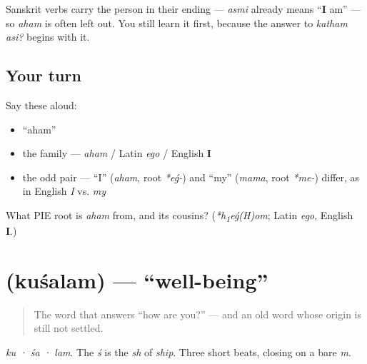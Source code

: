 \begin{grammarlens}[title={Grammar Lens: \textquotedblleft{}I\textquotedblright{} can be dropped}]
Sanskrit verbs carry the person in their ending — \emph{asmi} already means \textquotedblleft{}\textbf{I} am\textquotedblright{} — so \emph{aham} is often left out. You still learn it first, because the answer to \emph{katham asi?} begins with it.
\end{grammarlens}

\subsection*{Your turn}
Say these aloud:

\begin{itemize}
\raggedright
  \item \textquotedblleft{}aham\textquotedblright{}
  \item the family — \emph{aham} / Latin \emph{ego} / English \textbf{I}
  \item the odd pair — \textquotedblleft{}I\textquotedblright{} (\emph{aham}, root \emph{*eǵ-}) and \textquotedblleft{}my\textquotedblright{} (\emph{mama}, root \emph{*me-}) differ, as in English \emph{I} vs. \emph{my}
\end{itemize}

\begin{tcolorbox}[breakable,colback=teal!4,colframe=teal!35!black,title={Before you move on}]
What PIE root is \emph{aham} from, and its cousins? (\emph{*h\textsubscript{1}eǵ(H)om}; Latin \emph{ego}, English \textbf{I}.)
\end{tcolorbox}
\section[\texorpdfstring{\sk{कुशलम्} (kuśalam)}{कुशलम् (kuśalam)}]{ (kuśalam) — \textquotedblleft{}well-being\textquotedblright{}}

\label{lesson:SA-C03-kushalam}



\begin{quote}
The word that answers \textquotedblleft{}how are you?\textquotedblright{} — and an old word whose origin is still not settled.
\end{quote}

\begin{sounds}
\emph{ku · śa · lam}. The \emph{ś} is the \emph{sh} of \emph{ship}. Three short beats, closing on a bare \emph{m}.
\end{sounds}

